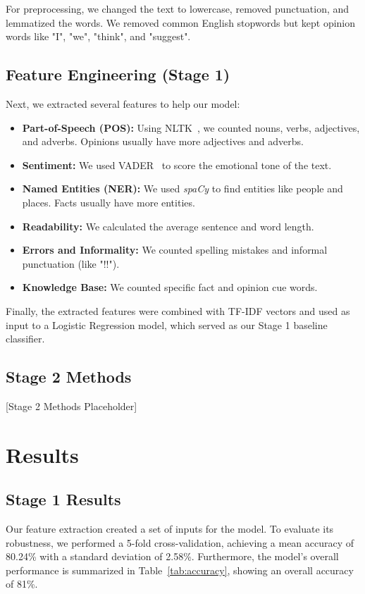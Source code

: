 \documentclass[12pt,a4paper,twocolumn]{article}
\begin{document}
For preprocessing, we changed the text to lowercase, removed punctuation, and lemmatized the words. We removed common English stopwords but kept opinion words like "I", "we", "think", and "suggest".

\subsection{Feature Engineering (Stage 1)}
Next, we extracted several features to help our model:
\begin{itemize}
    \item \textbf{Part-of-Speech (POS):} Using NLTK~\citep{bird2009natural}, we counted nouns, verbs, adjectives, and adverbs. Opinions usually have more adjectives and adverbs.
    \item \textbf{Sentiment:} We used VADER~\citep{hutto2014vader} to score the emotional tone of the text.
    \item \textbf{Named Entities (NER):} We used \textit{spaCy} to find entities like people and places. Facts usually have more entities.
    \item \textbf{Readability:} We calculated the average sentence and word length.
    \item \textbf{Errors and Informality:} We counted spelling mistakes and informal punctuation (like "!!").
    \item \textbf{Knowledge Base:} We counted specific fact and opinion cue words.
\end{itemize}

Finally, the extracted features were combined with TF-IDF vectors and used as input to a Logistic Regression model, which served as our Stage 1 baseline classifier.

\subsection{Stage 2 Methods}
[Stage 2 Methods Placeholder]

\section{Results}
\label{sec:results}
\subsection{Stage 1 Results}
Our feature extraction created a set of inputs for the model. To evaluate its robustness, we performed a 5-fold cross-validation, achieving a mean accuracy of 80.24\% with a standard deviation of 2.58\%. Furthermore, the model's overall performance is summarized in Table~\ref{tab:accuracy}, showing an overall accuracy of 81\%.
\end{document}
